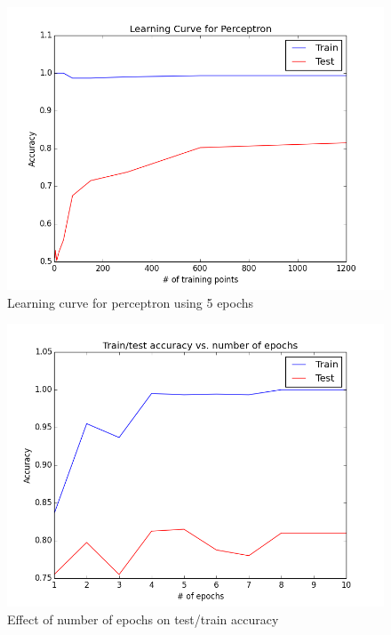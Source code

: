 \documentclass{article}
\begin{document}
	\begin{figure} [h!]
		\centering
		\includegraphics[scale = .65]{LC_perceptron.png}
		\caption{Learning curve for perceptron using 5 epochs}
		\label{lc_percept_fig}
	\end{figure}
		
	\begin{figure} [h!]
		\centering
		\includegraphics[scale = .65]{Epochs_train_test.png}
		\caption{Effect of number of epochs on test/train accuracy}
		\label{epoch_tt_fig}
	\end{figure}
	
%
%			
%	
	
	

	
\end{document}
